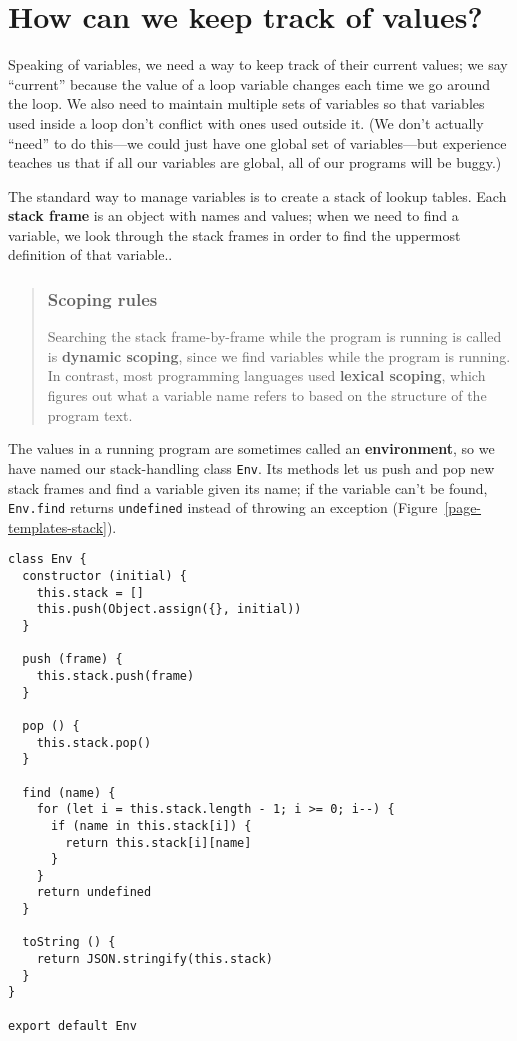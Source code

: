 \documentclass[krantzl]{krantz}
\newcommand{\figref}[1]{Figure~\ref{#1}}
\newcommand{\glossref}[1]{\textbf{#1}}
\newenvironment{callout}{\savenotes\begin{tBox}\begin{quotation}\toggletrue{inbox}\renewcommand{\thempfootnote}{\arabic{footnote}}}{\end{quotation}\vspace{\baselineskip}\end{tBox}\togglefalse{inbox}\spewnotes}
\begin{document}
\section{How can we keep track of values?}\label{page-templates-values}


Speaking of variables,
we need a way to keep track of their current values;
we say “current” because the value of a loop variable changes each time we go around the loop.
We also need to maintain multiple sets of variables
so that variables used inside a loop
don’t conflict with ones used outside it.
(We don’t actually “need” to do this—we could just have one global set of variables—but
experience teaches us that if all our variables are global,
all of our programs will be buggy.)


The standard way to manage variables is to create a stack of lookup tables.
Each \glossref{stack frame} is an object with names and values;
when we need to find a variable,
we look through the stack frames in order to find the uppermost definition of that variable..

\begin{callout}


\subsubsection*{Scoping rules}


Searching the stack frame-by-frame
while the program is running
is called is \glossref{dynamic scoping},
since we find variables while the program is running.
In contrast,
most programming languages used \glossref{lexical scoping},
which figures out what a variable name refers to based on the structure of the program text.

\end{callout}


The values in a running program are sometimes called
an \glossref{environment},
so we have named our stack-handling class \texttt{Env}.
Its methods let us push and pop new stack frames
and find a variable given its name;
if the variable can’t be found,
\texttt{Env.find} returns \texttt{undefined} instead of throwing an exception
(\figref{page-templates-stack}).


\begin{lstlisting}[frame=tblr]
class Env {
  constructor (initial) {
    this.stack = []
    this.push(Object.assign({}, initial))
  }

  push (frame) {
    this.stack.push(frame)
  }

  pop () {
    this.stack.pop()
  }

  find (name) {
    for (let i = this.stack.length - 1; i >= 0; i--) {
      if (name in this.stack[i]) {
        return this.stack[i][name]
      }
    }
    return undefined
  }

  toString () {
    return JSON.stringify(this.stack)
  }
}

export default Env
\end{lstlisting}
\end{document}
